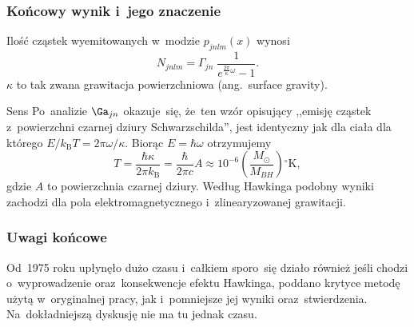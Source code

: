 \documentclass{beamer}  %
\begin{document}
\begin{frame}
  \frametitle{Końcowy wynik i~jego znaczenie}

  \begin{block}{} %
    Ilość cząstek wyemitowanych w~modzie $p_{ j n l m }( x )$ wynosi
    \begin{equation}
      \label{eq:HawkingPromieniowanie-29}
      N_{ j n l m } = \Gamma_{ j n }\;
      \frac{ 1 }{ e^{  \frac{ 2 \pi }{ \kappa } \omega } - 1 }.
    \end{equation}
    $\kappa$ to tak zwana grawitacja powierzchniowa (ang.~surface
    gravity).
  \end{block}

  \begin{block}{Sens}
    Po~analizie $\Ga_{ j n }$ okazuje~się, że~ten wzór opisujący
    ,,emisję cząstek z~powierzchni czarnej dziury Schwarzschilda'',
    jest identyczny jak dla ciała dla którego
    $E / k_{ \textrm{B} } T = 2\pi \omega / \kappa$. Biorąc
    $E = \hbar \omega$ otrzymujemy
    \begin{equation}
      \label{eq:HawkingPromieniowanie-30}
      T = \frac{ \hbar \kappa }{ 2\pi k_{ \mathrm{B} } }
      = \frac{ \hbar }{ 2\pi c } A
      \approx 10^{ -6 } \left( \frac{ M_{ \odot } }{ M_{ BH } } \right)
      {}^{ \circ } \mathrm{K},
    \end{equation}
    gdzie $A$ to powierzchnia czarnej dziury. Według Hawkinga podobny
    wyniki zachodzi dla pola elektromagnetycznego i~zlinearyzowanej
    grawitacji.
  \end{block}

\end{frame}





\begin{frame}
  \frametitle{Uwagi końcowe}

  \begin{block}{}
    Od~1975 roku upłynęło dużo czasu i~całkiem sporo~się działo
    również jeśli chodzi o~wyprowadzenie oraz~konsekwencje efektu
    Hawkinga, poddano krytyce metodę użytą w~oryginalnej pracy, jak
    i~pomniejsze jej wyniki oraz~stwierdzenia. Na~dokładniejszą
    dyskusję nie ma tu jednak czasu.
  \end{block}

\end{frame}
\end{document}
